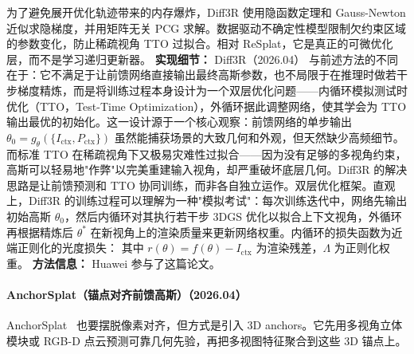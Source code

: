 为了避免展开优化轨迹带来的内存爆炸，Diff3R 使用隐函数定理和 Gauss-Newton 近似求隐梯度，并用矩阵无关 PCG 求解。数据驱动不确定性模型限制欠约束区域的参数变化，防止稀疏视角 TTO 过拟合。相对 ReSplat，它是真正的可微优化层，而不是学习递归更新器。
\textbf{实现细节：} Diff3R（2026.04） 与前述方法的不同在于：它不满足于让前馈网络直接输出最终高斯参数，也不局限于在推理时做若干步梯度精炼，而是将训练过程本身设计为一个双层优化问题——内循环模拟测试时优化（TTO，Test-Time Optimization），外循环据此调整网络，使其学会为 TTO 输出最优的初始化。这一设计源于一个核心观察：前馈网络的单步输出 $\theta_0 = g_\theta(\{I_{\mathrm{ctx}}, P_{\mathrm{ctx}}\})$ 虽然能捕获场景的大致几何和外观，但天然缺少高频细节。而标准 TTO 在稀疏视角下又极易灾难性过拟合——因为没有足够的多视角约束，高斯可以轻易地"作弊"以完美重建输入视角，却严重破坏底层几何。Diff3R 的解决思路是让前馈预测和 TTO 协同训练，而非各自独立运作。双层优化框架。直观上，Diff3R 的训练过程可以理解为一种"模拟考试"：每次训练迭代中，网络先输出初始高斯 $\theta_0$，然后内循环对其执行若干步 3DGS 优化以拟合上下文视角，外循环再根据精炼后 $\theta^{*}$ 在新视角上的渲染质量来更新网络权重。内循环的损失函数为近端正则化的光度损失： 其中 $r(\theta) = f(\theta) - I_{\mathrm{ctx}}$ 为渲染残差，$\Lambda$ 为正则化权重。
\textbf{方法信息：} Huawei 参与了这篇论文。



\paragraph{AnchorSplat（锚点对齐前馈高斯）（2026.04）}
AnchorSplat~\cite{2604_07053} 也要摆脱像素对齐，但方式是引入 3D anchors。它先用多视角立体模块或 RGB-D 点云预测可靠几何先验，再把多视图特征聚合到这些 3D 锚点上。

